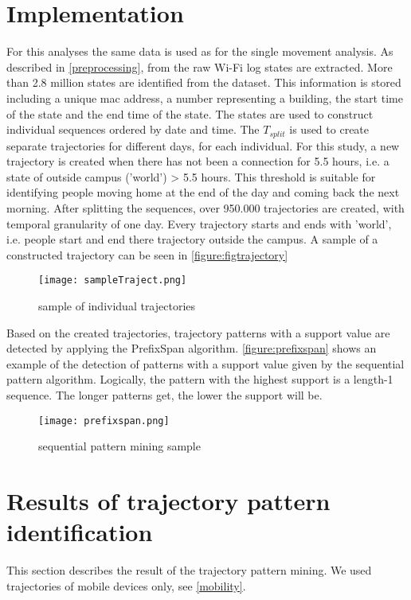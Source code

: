 \section{Implementation}
For this analyses the same data is used as for the single movement analysis. As described in \autoref{preprocessing}, from the raw Wi-Fi log states are extracted. More than 2.8 million states are identified from the dataset. This information is stored including a unique mac address, a number representing a building, the start time of the state and the end time of the state. The states are used to construct individual sequences ordered by date and time. The \textit{$T_{split}$} is used to create separate trajectories for different days, for each individual. For this study, a new trajectory is created when there has not been a connection for 5.5 hours, i.e. a state of outside campus ('world') > 5.5 hours. This threshold is suitable for identifying people moving home at the end of the day and coming back the next morning. After splitting the sequences, over 950.000 trajectories are created, with temporal granularity of one day. Every trajectory starts and ends with 'world', i.e. people start and end there trajectory outside the campus. A sample of a constructed trajectory can be seen in \autoref{figure:figtrajectory}

\begin{figure}[H]
\centering
\texttt{[image: sampleTraject.png]}
\captionsetup{justification=centering}
\caption{sample of individual trajectories}
\label{figure:figtrajectory}
\end{figure}
Based on the created trajectories, trajectory patterns with a support value are detected by applying the PrefixSpan algorithm. \autoref{figure:prefixspan} shows an example of the detection of patterns with a support value given by the sequential pattern algorithm. Logically, the pattern with the highest support is a length-1 sequence. The longer patterns get, the lower the support will be.  

\begin{figure}[H]
\centering
\texttt{[image: prefixspan.png]}
\captionsetup{justification=centering}
\caption{sequential pattern mining sample}
\label{figure:prefixspan}
\end{figure}


\section{Results of trajectory pattern identification}
This section describes the result of the trajectory pattern mining. We used trajectories of mobile devices only, see \autoref{mobility}. 
